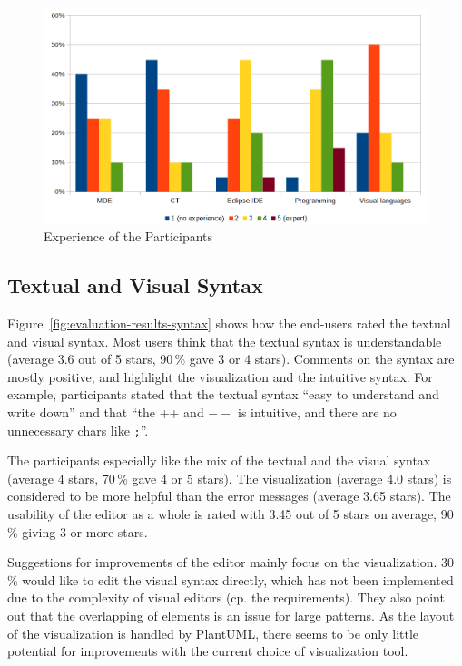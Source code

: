\begin{figure}[h!]
	\centering
	\includegraphics[width=\linewidth]{../common/figures/evaluation-results-experience-of-participants}
	\caption{Experience of the Participants}
	\label{fig:evaluation-results-experience-of-participants}
\end{figure}

\subsection{Textual and Visual Syntax}
\label{evaluation-syntax}
Figure~\ref{fig:evaluation-results-syntax} shows how the end-users rated the textual and visual syntax.
Most users think that the textual syntax is understandable (average 3.6 out of 5 stars, 90\,\% gave 3 or 4 stars).
Comments on the syntax are mostly positive, and highlight the visualization and the intuitive syntax.
For example, participants stated that the textual syntax ``easy to understand and write down'' and that ``the ++ and $--$ is intuitive, and there are no unnecessary chars like \texttt{;}''.

The participants especially like the mix of the textual and the visual syntax (average 4 stars, 70\,\% gave 4 or 5 stars).
The visualization (average 4.0 stars) is considered to be more helpful than the error messages (average 3.65 stars).
The usability of the editor as a whole is rated with 3.45 out of 5 stars on average, 90\,\% giving 3 or more stars.

Suggestions for improvements of the editor mainly focus on the visualization.
30\,\% would like to edit the visual syntax directly, which has not been implemented due to the complexity of visual editors (cp. the requirements).
They also point out that the overlapping of elements is an issue for large patterns.
As the layout of the visualization is handled by PlantUML, there seems to be only little potential for improvements with the current choice of visualization tool.

